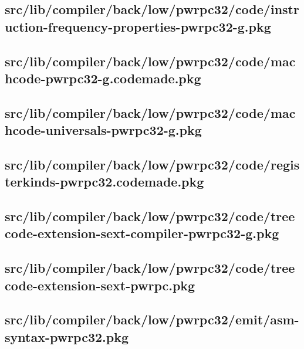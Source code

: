 \subsection{src/lib/compiler/back/low/pwrpc32/code/instruction-frequency-properties-pwrpc32-g.pkg}


\subsection{src/lib/compiler/back/low/pwrpc32/code/machcode-pwrpc32-g.codemade.pkg}


\subsection{src/lib/compiler/back/low/pwrpc32/code/machcode-universals-pwrpc32-g.pkg}


\subsection{src/lib/compiler/back/low/pwrpc32/code/registerkinds-pwrpc32.codemade.pkg}


\subsection{src/lib/compiler/back/low/pwrpc32/code/treecode-extension-sext-compiler-pwrpc32-g.pkg}


\subsection{src/lib/compiler/back/low/pwrpc32/code/treecode-extension-sext-pwrpc.pkg}


\subsection{src/lib/compiler/back/low/pwrpc32/emit/asm-syntax-pwrpc32.pkg}



